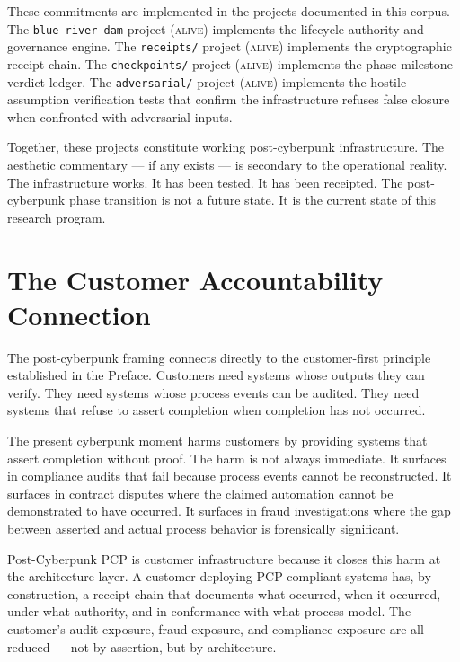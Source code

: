 These commitments are implemented in the projects documented in this corpus. The \texttt{blue-river-dam} project (\textsc{alive}) implements the lifecycle authority and governance engine. The \texttt{receipts/} project (\textsc{alive}) implements the cryptographic receipt chain. The \texttt{checkpoints/} project (\textsc{alive}) implements the phase-milestone verdict ledger. The \texttt{adversarial/} project (\textsc{alive}) implements the hostile-assumption verification tests that confirm the infrastructure refuses false closure when confronted with adversarial inputs.

Together, these projects constitute working post-cyberpunk infrastructure. The aesthetic commentary --- if any exists --- is secondary to the operational reality. The infrastructure works. It has been tested. It has been receipted. The post-cyberpunk phase transition is not a future state. It is the current state of this research program.

\section{The Customer Accountability Connection}

The post-cyberpunk framing connects directly to the customer-first principle established in the Preface. Customers need systems whose outputs they can verify. They need systems whose process events can be audited. They need systems that refuse to assert completion when completion has not occurred.

The present cyberpunk moment harms customers by providing systems that assert completion without proof. The harm is not always immediate. It surfaces in compliance audits that fail because process events cannot be reconstructed. It surfaces in contract disputes where the claimed automation cannot be demonstrated to have occurred. It surfaces in fraud investigations where the gap between asserted and actual process behavior is forensically significant.

Post-Cyberpunk PCP is customer infrastructure because it closes this harm at the architecture layer. A customer deploying PCP-compliant systems has, by construction, a receipt chain that documents what occurred, when it occurred, under what authority, and in conformance with what process model. The customer's audit exposure, fraud exposure, and compliance exposure are all reduced --- not by assertion, but by architecture.
